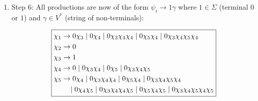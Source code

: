 \documentclass[12pt,a4paper,openany]{article}
\begin{document}
\begin{enumerate}
\begin{enumerate}
    \item Substitute $\chi_4$ into $\chi_5$ productions:
    
    For $\chi_5 \to \chi_4\chi_4$, substitute first $\chi_4$:

    \begin{align*}
    \chi_5 &\to 0\chi_4 \mid 0\chi_3\chi_4\chi_4 \mid 0\chi_5\chi_4 \mid 0\chi_3\chi_4\chi_5\chi_4
    \end{align*}
    
    For $\chi_5 \to \chi_4\chi_4\chi_5$, substitute first $\chi_4$:

    \begin{align*}
    \chi_5 &\to 0\chi_4\chi_5 \mid 0\chi_3\chi_4\chi_4\chi_5 \mid 0\chi_5\chi_4\chi_5 \mid 0\chi_3\chi_4\chi_5\chi_4\chi_5
    \end{align*}

    Combining both cases:

    \begin{align*}
    \chi_5 &\to 0\chi_4 \mid 0\chi_3\chi_4\chi_4 \mid 0\chi_5\chi_4 \mid 0\chi_3\chi_4\chi_5\chi_4 \\
        &\quad \mid 0\chi_4\chi_5 \mid 0\chi_3\chi_4\chi_4\chi_5 \mid 0\chi_5\chi_4\chi_5 \mid 0\chi_3\chi_4\chi_5\chi_4\chi_5
    \end{align*}

    \end{enumerate}

    \item Step 6: All productions are now of the form $\psi_i \to 1\gamma$ where $1 \in \Sigma$ (terminal $0$ or $1$) and $\gamma \in V^*$ (string of non-terminals):
    
    \[
    \fbox{$
    \begin{aligned}
    \chi_1 &\to 0\chi_3 \mid 0\chi_4 \mid 0\chi_3\chi_4\chi_4 \mid 0\chi_5\chi_4 \mid 0\chi_3\chi_4\chi_5\chi_4 \\
    \chi_2 &\to 0 \\
    \chi_3 &\to 1 \\
    \chi_4 &\to 0 \mid 0\chi_3\chi_4 \mid 0\chi_5 \mid 0\chi_3\chi_4\chi_5 \\
    \chi_5 &\to 0\chi_4 \mid 0\chi_3\chi_4\chi_4 \mid 0\chi_5\chi_4 \mid 0\chi_3\chi_4\chi_5\chi_4 \\
        &\quad \mid 0\chi_4\chi_5 \mid 0\chi_3\chi_4\chi_4\chi_5 \mid 0\chi_5\chi_4\chi_5 \mid 0\chi_3\chi_4\chi_5\chi_4\chi_5
    \end{aligned}
    $}
    \]
    
\end{enumerate}
\end{document}
